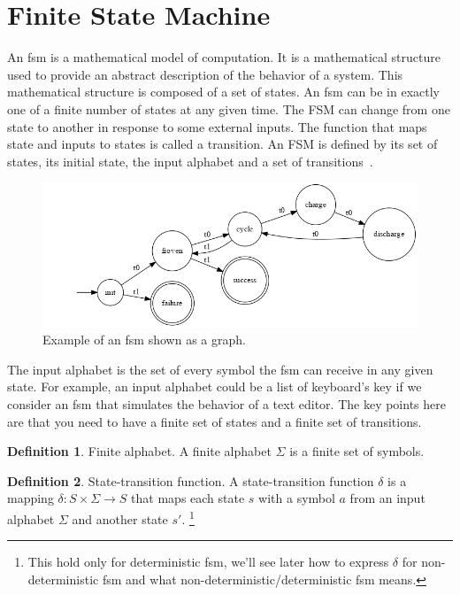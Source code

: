 \documentclass[12pt]{article}
\theoremstyle{definition}
\newtheorem{definition}{Definition}[section]
\theoremstyle{definition}
\theoremstyle{remark}
\begin{document}
\section{Finite State Machine}


An \gls{fsm} is a mathematical model of computation. It is a mathematical structure used to provide an abstract description of the behavior of a system. This mathematical structure is composed of a set of states. An \gls{fsm} can be in exactly one of a finite number of states at any given time. The FSM can change from one state to another in response to some external inputs. The function that maps state and inputs to states is called a transition. An FSM is defined by its set of states, its initial state, the input alphabet and a set of transitions~\cite{FSM:2017}.\\

\begin{figure}[H]
    \centering
    \includegraphics[scale=0.4]{graph/BatteryCycle.png}
    \caption{Example of an \gls{fsm} shown as a graph.}
    \label{battcycle}
\end{figure}

The input alphabet is the set of every symbol the \gls{fsm} can receive in any given state. For example, an input alphabet could be a list of keyboard's key if we consider an \gls{fsm} that simulates the behavior of a text editor. The key points here are that you need to have a finite set of states and a finite set of transitions.\\

\theoremstyle{definition}
\begin{definition}{Finite alphabet.} A finite alphabet $\Sigma$ is a finite set of symbols.
\end{definition}

\theoremstyle{definition}
\begin{definition}{State-transition function.} A state-transition function $\delta$ is a mapping $\delta:S\times \Sigma \rightarrow S$ that maps each state $s$ with a symbol $a$ from an input alphabet $\Sigma$ and another state $s'$.
\footnote{This hold only for deterministic \gls{fsm}, we'll see later how to express $\delta$ for non-deterministic \gls{fsm} and what non-deterministic/deterministic \gls{fsm} means.}
\end{definition}
\end{document}
